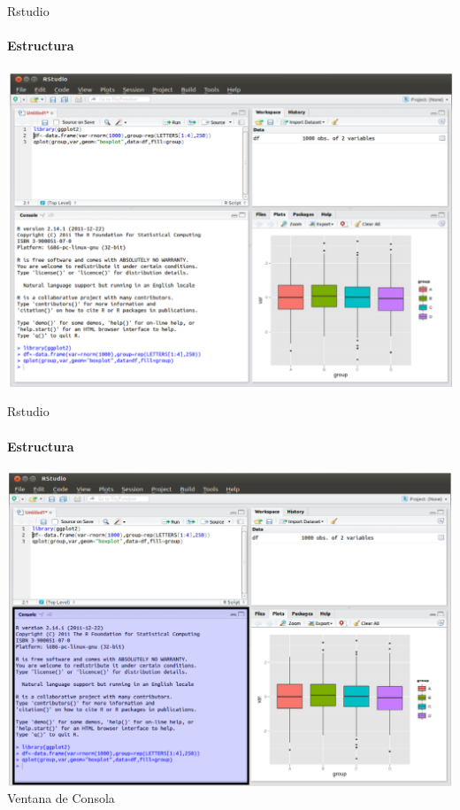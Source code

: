 \documentclass[12pt]{beamer}
\begin{document}
\begin{frame}{Rstudio}
\framesubtitle{Estructura}
\begin{center}
\includegraphics[scale=0.32]{images/rstudio}
\end{center}
\end{frame}
\begin{frame}{Rstudio}
\framesubtitle{Estructura}
\begin{center}
\includegraphics[scale=0.32]{images/rstudio1}\\
\footnotesize{Ventana de Consola}
\end{center}
\end{frame}
\end{document}
